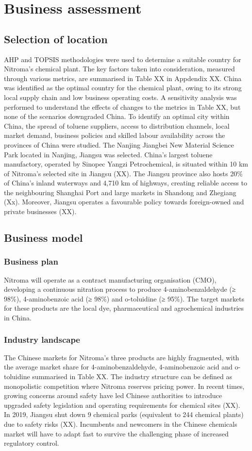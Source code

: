 \section{Business assessment}
\label{sec:economics}
\subsection{Selection of location} 
AHP and TOPSIS methodologies were used to determine a suitable country for Nitroma’s chemical plant. The key factors taken into consideration, measured through various metrics, are summarised in Table XX in Appdendix XX. China was identified as the optimal country for the chemical plant, owing to its strong local supply chain and low business operating costs. A sensitivity analysis was performed to understand the effects of changes to the metrics in Table XX, but none of the scenarios downgraded China. To identify an optimal city within China, the spread of toluene suppliers, access to distribution channels, local market demand, business policies and skilled labour availability across the provinces of China were studied. The Nanjing Jiangbei New Material Science Park located in Nanjing, Jiangsu was selected. China’s largest toluene manufactory, operated by Sinopec Yangzi Petrochemical, is situated within 10 km of Nitroma’s selected site in Jiangsu (XX). The Jiangsu province also hosts 20\% of China’s inland waterways and 4,710 km of highways, creating reliable access to the neighbouring Shanghai Port and large markets in Shandong and Zhegiang (Xx). Moreover, Jiangsu operates a favourable policy towards foreign-owned and private businesses (XX). 

\subsection{Business model} 
\subsubsection{Business plan}
Nitroma will operate as a contract manufacturing organisation (CMO), developing a continuous nitration process to produce 4-aminobenzaldehyde (≥ 98\%), 4-aminobenzoic acid (≥ 98\%) and o-toluidine (≥ 95\%). The target markets for these products are the local dye, pharmaceutical and agrochemical industries in China.
\subsubsection{Industry landscape}
The Chinese markets for Nitroma’s three products are highly fragmented, with the average market share for 4-aminobenzaldehyde, 4-aminobenzoic acid and o-toluidine summarised in Table XX. The industry structure can be defined as monopolistic competition where Nitroma reserves pricing power. In recent times, growing concerns around safety have led Chinese authorities to introduce upgraded safety legislation and operating requirements for chemical sites (XX). In 2019, Jiangsu shut down 9 chemical parks (equivalent to 244 chemical plants) due to safety risks (XX). Incumbents and newcomers in the Chinese chemicals market will have to adapt fast to survive the challenging phase of increased regulatory control. 

